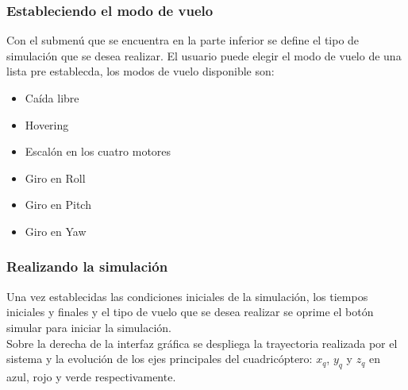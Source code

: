 \documentclass[main]{subfiles}
\begin{document}
\subsubsection*{Estableciendo el modo de vuelo}
Con el submen\'u que se encuentra en la parte inferior se define el tipo de simulaci\'on que se desea realizar. El usuario puede elegir el modo de vuelo de una lista pre establecda, los modos de vuelo disponible son:
\begin{itemize}
\item Ca\'ida libre
\item Hovering
\item Escal\'on en los cuatro motores
\item Giro en Roll
\item Giro en Pitch
\item Giro en Yaw
\end{itemize}

\subsubsection*{Realizando la simulaci\'on}
Una vez establecidas las condiciones iniciales de la simulaci\'on, los tiempos iniciales y finales y el tipo de vuelo que se desea realizar se oprime el bot\'on simular para iniciar la simulaci\'on.\\

Sobre la derecha de la interfaz gr\'afica se despliega la trayectoria realizada por el sistema y la evoluci\'on de los ejes principales del cuadric\'optero: $x_q$, $y_q$ y $z_q$ en azul, rojo y verde respectivamente.\\
\end{document}
